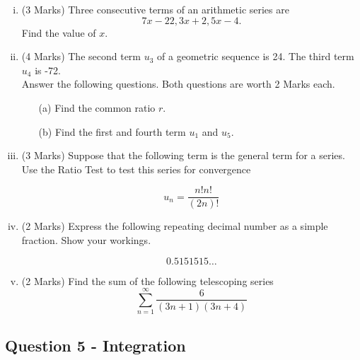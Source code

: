 \documentclass[a4paper,12pt]{article}
\begin{document}
\begin{enumerate}[(i)]


	\item (3 Marks)	Three consecutive terms of an arithmetic series are \[7x-22, 3x+2 , 5x-4. \]
	Find the value of $x$.
	

\bigskip
	\item (4 Marks)
	The second term $u_3$ of a geometric sequence is 24. The third term $u_4$ is -72. \\ \bigskip Answer the following questions. Both questions are worth 2 Marks each.
	\begin{itemize}
		\item[(a)] Find the common ratio $r$. 
		\item[(b)] Find the first and fourth term $u_1$ and $u_5$.
	\end{itemize}
	
	
	\bigskip	
	\item (3 Marks) Suppose that the following term is the general term for a series. Use the Ratio Test to test this series for convergence
	
	\[u_n=\frac{n!n!}{(2n)!}\]

\bigskip
	

\bigskip
		
	\item (2 Marks) Express the following repeating decimal number as a simple fraction. Show your workings.
	
	\[0.5151515\ldots\]
	\item (2 Marks) Find the sum of the following telescoping series
	\[  \sum^{\infty}_{n=1}   \frac{6}{(3n+1)(3n+4)}  \]
%	
%	
	
	
	
\end{enumerate}

\newpage
\subsection*{Question 5 - Integration}


\end{document}
